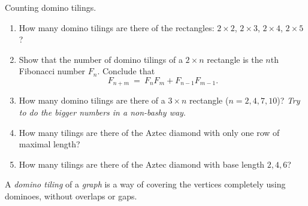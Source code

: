 \documentclass[11pt,fleqn]{book} %
\begin{document}
\begin{problem}
    Counting domino tilings.
    \begin{enumerate}[label=\alph*.]
        \item How many domino tilings are there of the rectangles: $2\times2$, $2\times3$, $2\times4$, $2\times5$?
        \item Show that the number of domino tilings of a $2\times n$ rectangle is the $n$th Fibonacci number $F_n$. Conclude that 
        $$F_{n+m} \ = \ F_n F_m + F_{n-1}F_{m-1}.$$
        \item How many domino tilings are there of a $3\times n$ rectangle ($n= 2 ,4, 7, 10$)? \textit{Try to do the bigger numbers in a non-bashy way}.
        \item How many tilings are there of the Aztec diamond with only one row of maximal length?
        \item How many tilings are there of the Aztec diamond with base length $2, 4, 6$?
    \end{enumerate}
\end{problem}



\begin{definition}
    A \emph{domino tiling} of a \emph{graph} is a way of covering the vertices completely using dominoes, without overlaps or gaps.
\begin{center}
 \end{center}
\end{definition}
\end{document}
